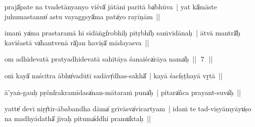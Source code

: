 \documentclass[parskip, DIV=14]{scrartcl}
\begin{document}
prajā̍pate॒॒ na tvade॒॒tānya॒nyo viśvā̍ jā॒॒tāni॒ pari॒tā ba̍bhūva~| yat kā̍māste juhu॒mastanno̍ astu va॒yaggsyā̍ma॒ pata̍yo rayī॒ṇām~||


i॒maṁ ya̍ma prasta॒ramā hi sīdāṅgi̍robhiḥ pi॒tṛbhi̍ḥ saṁvidā॒॒naḥ~| ātvā॒॒ mantrā̎ḥ kaviśa॒stā va̍hantve॒॒nā rā̍jan ha॒viṣā̍ mādayasva~||


om adhidevatā pratyadhidevatā sahitāya śanaiśca̍rāya॒ nama̍ḥ~||~\,7\,~||
\vspace{0.5cm}


oṁ kayā̍ naści॒tra ābhu̍vadū॒tī sa॒dāvṛ̍dha॒s-sakhā̎~| kayā॒॒ śaci̍ṣṭhayā vṛ̱tā~||


ā'yaṅ-gauḥ pṛśni̍rakramī॒dasa̍nan-mā॒॒tara॒ṁ puna̍ḥ~| pi॒tara̍ñca pra॒yant-suva̍ḥ~||


yatte̍ de॒॒vī niṛṛ̍tir-āba॒bandha॒ dāma̍ grī॒vāsva̍vica॒rtyam~| i॒daṁ te॒॒ tad-viṣyā॒॒myāyu̍ṣo॒ na madhyā॒॒dathā̍ jī॒vaḥ pi॒tuma̍ddhi॒ pramu̍ktaḥ~||

\end{document}
